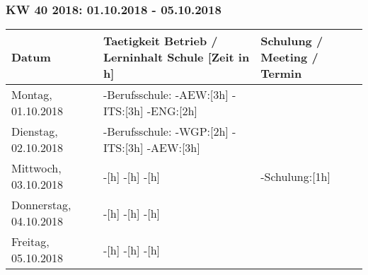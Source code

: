 \documentclass{pfdoc}
\begin{document}
\subsubsection{KW 40 2018: 01.10.2018 - 05.10.2018}
\begin{tabular}{|L{2cm}|L{10cm}|L{5cm}|}
\hline
\textbf{Datum} & \textbf{Taetigkeit Betrieb / Lerninhalt Schule [Zeit in h]} & \textbf{Schulung / Meeting / Termin} \\
\hline
Montag, 01.10.2018
&
-Berufsschule: \linebreak
-AEW:[3h] \linebreak
-ITS:[3h] \linebreak
-ENG:[2h] \linebreak
&
\\
\hline
Dienstag, 02.10.2018
&
-Berufsschule: \linebreak
-WGP:[2h] \linebreak
-ITS:[3h] \linebreak
-AEW:[3h] \linebreak
&
\\
\hline
Mittwoch, 03.10.2018
&
-[h] \linebreak
-[h] \linebreak
-[h] \linebreak
&
-Schulung:[1h] \linebreak
\\
\hline
Donnerstag, 04.10.2018
&
-[h] \linebreak
-[h] \linebreak
-[h] \linebreak
&
\\
\hline
Freitag, 05.10.2018
&
-[h] \linebreak
-[h] \linebreak
-[h] \linebreak
&
\\
\hline
\end{tabular}
\vfill
{}

\newpage
\end{document}
